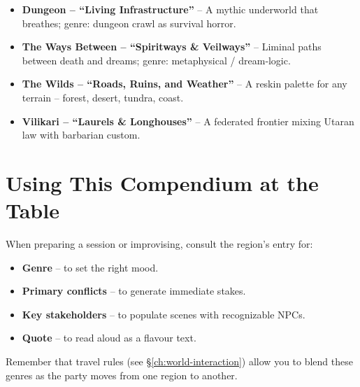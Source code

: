 \begin{itemize}
  \item \textbf{Dungeon – “Living Infrastructure”} – A mythic underworld that breathes; genre: dungeon crawl as survival horror.
  \item \textbf{The Ways Between – “Spiritways \& Veilways”} – Liminal paths between death and dreams; genre: metaphysical / dream‑logic.
  \item \textbf{The Wilds – “Roads, Ruins, and Weather”} – A reskin palette for any terrain – forest, desert, tundra, coast.
  \item \textbf{Vilikari – “Laurels \& Longhouses”} – A federated frontier mixing Utaran law with barbarian custom.
\end{itemize}

\section{Using This Compendium at the Table}

When preparing a session or improvising, consult the region’s entry for:
\begin{itemize}
  \item \textbf{Genre} – to set the right mood.
  \item \textbf{Primary conflicts} – to generate immediate stakes.
  \item \textbf{Key stakeholders} – to populate scenes with recognizable NPCs.
  \item \textbf{Quote} – to read aloud as a flavour text.
\end{itemize}

Remember that travel rules (see \S\ref{ch:world-interaction}) allow you to blend these genres as the party moves from one region to another.
